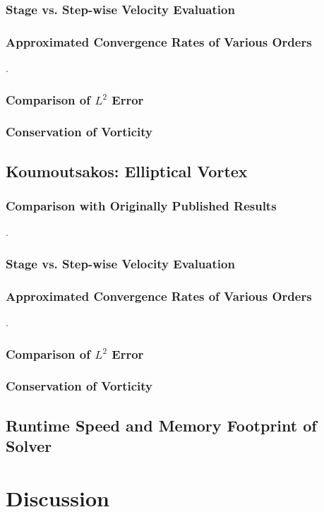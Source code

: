 \documentclass[letterpaper,12pt]{report}
\begin{document}
\subsection{Stage vs. Step-wise Velocity Evaluation}
\newpage
\subsection{Approximated Convergence Rates of Various Orders}
\newpage.
\newpage
\subsection{Comparison of $L^2$ Error}
\newpage
\subsection{Conservation of Vorticity}

%
\section{Koumoutsakos: Elliptical Vortex}
\subsection{Comparison with Originally Published Results}
\newpage.
\newpage
\subsection{Stage vs. Step-wise Velocity Evaluation}
\subsection{Approximated Convergence Rates of Various Orders}
\newpage.
\newpage
\subsection{Comparison of $L^2$ Error}
\newpage
\subsection{Conservation of Vorticity}
\newpage

\section{Runtime Speed and Memory Footprint of Solver}
\newpage
\chapter{Discussion}
\end{document}
